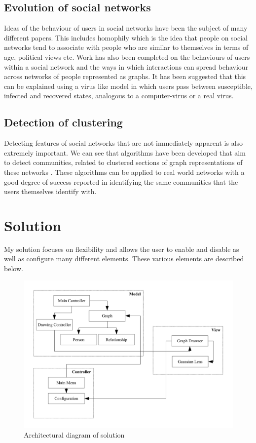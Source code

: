 \documentclass[12pt,a4paper]{article}
\begin{document}
\subsection{Evolution of social networks}
Ideas of the behaviour of users in social networks have been the subject of many different papers. This includes homophily \cite{adamic2003social} which is the idea that people on social networks tend to associate with people who are similar to themselves in terms of age, political views etc. Work has also been completed on the behaviours of users within a social network and the ways in which interactions can spread behaviour across networks of people represented as graphs. It has been suggested that this can be explained using a virus like model \cite{centola2010spread} in which users pass between susceptible, infected and recovered states, analogous to a computer-virus or a real virus.

\subsection{Detection of clustering}
Detecting features of social networks that are not immediately apparent is also extremely important. We can see that algorithms have been developed that aim to detect communities, related to clustered sections of graph representations of these networks \cite{newman2004fast}. These algorithms can be applied to real world networks with a good degree of success reported in identifying the same communities that the users themselves identify with.

\section{Solution}

My solution focuses on flexibility and allows the user to enable and disable as well as configure many different elements. These various elements are described below.

\begin{figure}[htb]
\begin{center}
\caption{Architectural diagram of solution}
\label{fig:diagram}
\includegraphics[scale=0.75]{ArchitectureDiagram.pdf}
\end{center}
\end{figure}
\end{document}
